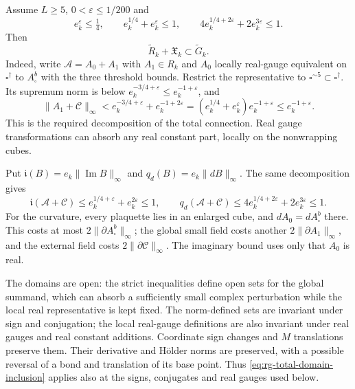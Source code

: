 Assume $L\ge5$, $0<\varepsilon\le1/200$ and
\begin{equation}\label{eq:rg-domain-charge-conditions}
 e_k^\varepsilon\le\tfrac14,\qquad
 e_k^{1/4}+e_k^\varepsilon\le1,\qquad
 4e_k^{1/4+2\varepsilon}+2e_k^{3\varepsilon}\le1.
\end{equation}
Then
\begin{equation}\label{eq:rg-total-domain-inclusion}
 \widetilde R_k+\mathfrak X_k\subset\widetilde G_k.
\end{equation}
Indeed, write $\mathscr A=A_0+A_1$ with $A_1\in R_k$ and
$A_0$ locally real-gauge equivalent on $\square^\dagger$ to
$A_\square^b$ with the three threshold bounds. Restrict the
representative to $\square^{\sim5}\subset\square^\dagger$.
Its supremum norm is below
$e_k^{-3/4+\varepsilon}\le e_k^{-1+\varepsilon}$, and
\[
 \|A_1+\mathscr C\|_\infty
 <e_k^{-3/4+\varepsilon}+e_k^{-1+2\varepsilon}
 =(e_k^{1/4}+e_k^\varepsilon)e_k^{-1+\varepsilon}
 \le e_k^{-1+\varepsilon}.
\]
This is the required decomposition of the total connection.
Real gauge transformations can absorb any real constant part,
locally on the nonwrapping cubes.

Put $\mathfrak i(B)=e_k\|\operatorname{Im}B\|_\infty$ and
$q_d(B)=e_k\|dB\|_\infty$. The same decomposition gives
\begin{equation}\label{eq:rg-total-imaginary-curvature-bounds}
 \mathfrak i(\mathscr A+\mathscr C)
       \le e_k^{1/4+\varepsilon}+e_k^{2\varepsilon}\le1,
 \qquad
 q_d(\mathscr A+\mathscr C)
       \le4e_k^{1/4+2\varepsilon}+2e_k^{3\varepsilon}\le1.
\end{equation}
For the curvature, every plaquette lies in an enlarged cube,
and $dA_0=dA_\square^b$ there. This costs at most
$2\|\partial A_\square^b\|_\infty$; the global small field
costs another $2\|\partial A_1\|_\infty$, and the external
field costs $2\|\partial\mathscr C\|_\infty$.
The imaginary bound uses only that $A_0$ is real.

The domains are open: the strict inequalities define open
sets for the global summand, which can absorb a sufficiently
small complex perturbation while the local real representative
is kept fixed. The norm-defined sets are invariant under sign
and conjugation; the local real-gauge definitions are also
invariant under real gauges and real constant additions.
Coordinate sign changes and $M$ translations preserve them.
Their derivative and H\"older norms are preserved, with a
possible reversal of a bond and translation of its base point.
Thus \eqref{eq:rg-total-domain-inclusion} applies also at the
signs, conjugates and real gauges used below.

